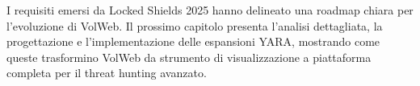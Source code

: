 I requisiti emersi da Locked Shields 2025 hanno delineato una roadmap chiara per l'evoluzione di VolWeb. Il prossimo capitolo presenta l'analisi dettagliata, la progettazione e l'implementazione delle espansioni YARA, mostrando come queste trasformino VolWeb da strumento di visualizzazione a piattaforma completa per il threat hunting avanzato.